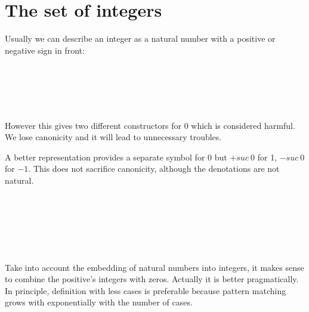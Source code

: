 \section{The set of integers}

Usually we can describe an integer as a natural number with a positive
or negative sign in front: 

\begin{code}
\\
\>  \AgdaSymbol{:}  \<%
\\
\>[0]\<[2]%
\>[2]\AgdaInductiveConstructor{+\_} \AgdaSymbol{:}   \<%
\\
\>[0]\<[2]%
\>[2]\AgdaInductiveConstructor{-\_} \AgdaSymbol{:}   \<%
\\
\end{code}

However this gives two different constructors for 0 which is
considered harmful. We lose canonicity and it will lead to unnecessary troubles.

A better representation provides a separate symbol for 0 but $+suc~
0$ for 1, $-suc ~0$ for $- 1$. This does not sacrifice canonicity,
although the denotations are not natural.

\begin{code}
\\
\>  \AgdaSymbol{:}  \<%
\\
\>[0]\<[2]%
\>[2] \AgdaSymbol{:}   \<%
\\
\>[0]\<[2]%
\>[2] \<[8]%
\>[8]\AgdaSymbol{:} \<%
\\
\>[0]\<[2]%
\>[2] \AgdaSymbol{:}   \<%
\\
\>\<\end{code}

Take into account the embedding of natural numbers into integers, it
makes sense to combine the positive's integers with zeros. Actually it is
better pragmatically. In principle, definition with less
cases is preferable because pattern matching grows with exponentially
with the number of cases.

